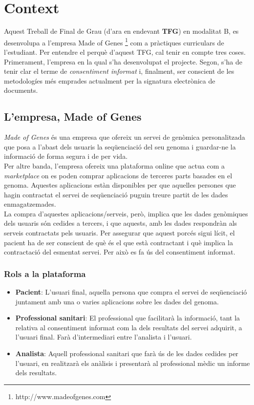 \section{Context}

Aquest Treball de Final de Grau (d'ara en endevant \textbf{TFG}) en modalitat B, es desenvolupa a l'empresa Made of Genes \footnote{http://www.madeofgenes.com} com a pràctiques curriculars de l'estudiant.
\newline Per entendre el perquè d'aquest TFG, cal tenir en compte tres coses. Primerament, l'empresa en la qual s'ha desenvolupat el projecte. 
\newline Segon, s'ha de tenir clar el terme de \textit{consentiment informat} i, finalment, ser conscient de les metodologíes més emprades actualment per la signatura electrònica de documents.

\subsection{L'empresa, Made of Genes}
\textit{Made of Genes} és una empresa que ofereix un servei de genòmica personalitzada que posa a l'abast dels usuaris la seqüenciació del seu genoma i guardar-ne la informació de forma segura i de per vida.\\
Per altre banda, l'empresa ofereix una plataforma online que actua com a \textit{marketplace} on es poden comprar aplicacions de terceres parts basades en el genoma.
Aquestes aplicacions estàn disponibles per que aquelles persones que hagin contractat el servei de seqüenciació puguin treure partit de les dades enmagatzemades.\\
\newline La compra d'aquestes aplicacions/serveis, però, implica que les dades genòmiques dels usuaris són cedides a  tercers, i que aquests, amb les dades respondràn als serveis contractats pels usuaris. 
\newline Per assegurar que aquest porcés sigui lícit, el pacient ha de ser conscient de què és el que està contractant i què implica la contractació del esmentat servei. Per això es fa ús del consentiment informat.

\subsubsection{Rols a la plataforma}
\begin{itemize}
	\item \textbf{Pacient}: L'usuari final, aquella persona que compra el servei de seqüenciació juntament amb una o varies aplicacions sobre les dades del genoma.
	\item \textbf{Professional sanitari}: El professional que facilitarà la informació, tant la relativa al consentiment informat com la dels resultats del servei adquirit, a l'usuari final. Farà d'intermediari entre l'analista i l'usuari.
	\item \textbf{Analista}: Aquell professional sanitari que farà ús de les dades cedides per l'usuari, en realitzarà els anàlisis i presentarà al professional mèdic un informe dels resultats.
\end{itemize}

